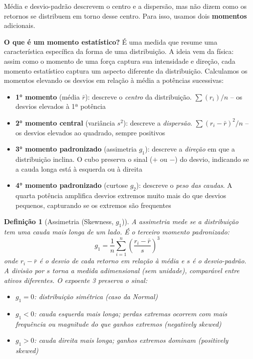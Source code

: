 \documentclass[11pt,a4paper]{article}
\theoremstyle{quant}
\newtheorem{definicao}{Definição}[section]
\begin{document}
Média e desvio-padrão descrevem o centro e a dispersão, mas não dizem como os retornos
se distribuem em torno desse centro. Para isso, usamos dois \textbf{momentos} adicionais.

\textbf{O que é um momento estatístico?} É uma medida que resume uma característica
específica da forma de uma distribuição. A ideia vem da física: assim como o momento de
uma força captura sua intensidade e direção, cada momento estatístico captura um aspecto
diferente da distribuição. Calculamos os momentos elevando os desvios em relação à média
a potências sucessivas:

\begin{itemize}
  \item \textbf{1° momento} (média $\bar{r}$): descreve o \emph{centro} da distribuição.
        $\sum(r_i)/n$ -- os desvios elevados à 1ª potência
  \item \textbf{2° momento central} (variância $s^2$): descreve a \emph{dispersão}.
        $\sum(r_i - \bar{r})^2/n$ -- os desvios elevados ao quadrado, sempre positivos
  \item \textbf{3° momento padronizado} (assimetria $g_1$): descreve a \emph{direção}
        em que a distribuição inclina. O cubo preserva o sinal ($+$ ou $-$) do desvio,
        indicando se a cauda longa está à esquerda ou à direita
  \item \textbf{4° momento padronizado} (curtose $g_2$): descreve o \emph{peso das caudas}.
        A quarta potência amplifica desvios extremos muito mais do que desvios pequenos,
        capturando se os extremos são frequentes
\end{itemize}

\begin{definicao}[Assimetria (Skewness, $g_1$)]
A assimetria mede se a distribuição tem uma cauda mais longa de um lado.
É o terceiro momento padronizado:
\[
  g_1 = \frac{1}{n}\sum_{i=1}^{n}\left(\frac{r_i - \bar{r}}{s}\right)^{\!3}
\]
onde $r_i - \bar{r}$ é o desvio de cada retorno em relação à média e $s$ é o
desvio-padrão. A divisão por $s$ torna a medida adimensional (sem unidade),
comparável entre ativos diferentes. O expoente 3 preserva o sinal:
\begin{itemize}
  \item $g_1 = 0$: distribuição simétrica (caso da Normal)
  \item $g_1 < 0$: cauda esquerda mais longa; perdas extremas ocorrem com mais frequência
        ou magnitude do que ganhos extremos (\emph{negatively skewed})
  \item $g_1 > 0$: cauda direita mais longa; ganhos extremos dominam (\emph{positively skewed})
\end{itemize}
\end{definicao}
\end{document}
